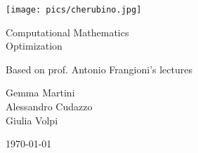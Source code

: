\documentclass[ComputationalMathematics.tex]{subfiles}
\begin{document}
\begin{titlepage}
    \begin{center}
    \vspace{3cm}
    
    \Large
    
    \vspace{2cm}
    
    \texttt{[image: pics/cherubino.jpg]}
    
    \vspace{2.5cm}
    
    {\Huge \sc Computational Mathematics\\ Optimization}
    
    \vspace{2cm}
    Based on prof. Antonio Frangioni's lectures
    
    \vspace{2cm}
    Gemma Martini\\ Alessandro Cudazzo\\ Giulia Volpi
    \vfill
    
    \today
    
    \end{center}
\end{titlepage}

\shipout\null

\tableofcontents
\let\tableofcontents\relax
\shipout\null

\newpage



\newpage



\newpage



\newpage



\newpage



\newpage



\newpage



\newpage



\newpage



\newpage
\end{document}
